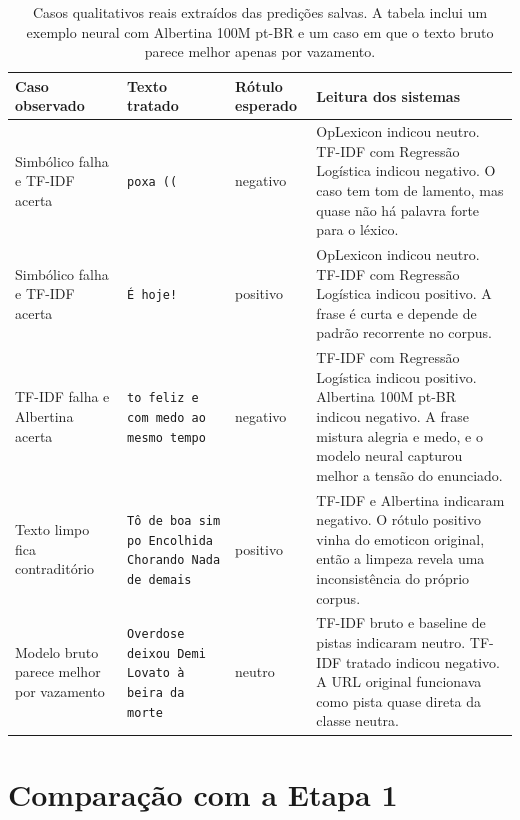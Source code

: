 \documentclass[11pt,a4paper]{article}
\newcommand{\altrowcolors}{\rowcolors{2}{black!4}{white}}
\newcommand{\clearrowcolors}{\rowcolors{2}{}{}}
\begin{document}
\begin{table}[p]
\footnotesize
\centering
\renewcommand{\arraystretch}{1.18}
\altrowcolors
\begin{tabularx}{\linewidth}{@{}L{2.9cm}Y L{1.7cm}Y@{}}
\toprule
\textbf{Caso observado} & \textbf{Texto tratado} & \textbf{Rótulo esperado} & \textbf{Leitura dos sistemas} \\
\midrule
Simbólico falha e TF-IDF acerta & \texttt{poxa ((} & negativo & OpLexicon indicou neutro. TF-IDF com Regressão Logística indicou negativo. O caso tem tom de lamento, mas quase não há palavra forte para o léxico. \\
\addlinespace[0.35em]
Simbólico falha e TF-IDF acerta & \texttt{É hoje!} & positivo & OpLexicon indicou neutro. TF-IDF com Regressão Logística indicou positivo. A frase é curta e depende de padrão recorrente no corpus. \\
\addlinespace[0.35em]
TF-IDF falha e Albertina acerta & \texttt{to feliz e com medo ao mesmo tempo} & negativo & TF-IDF com Regressão Logística indicou positivo. Albertina 100M pt-BR indicou negativo. A frase mistura alegria e medo, e o modelo neural capturou melhor a tensão do enunciado. \\
\addlinespace[0.35em]
Texto limpo fica contraditório & \texttt{Tô de boa sim po Encolhida Chorando Nada de demais} & positivo & TF-IDF e Albertina indicaram negativo. O rótulo positivo vinha do emoticon original, então a limpeza revela uma inconsistência do próprio corpus. \\
\addlinespace[0.35em]
Modelo bruto parece melhor por vazamento & \texttt{Overdose deixou Demi Lovato à beira da morte} & neutro & TF-IDF bruto e baseline de pistas indicaram neutro. TF-IDF tratado indicou negativo. A URL original funcionava como pista quase direta da classe neutra. \\
\bottomrule
\end{tabularx}
\clearrowcolors
\caption{Casos qualitativos reais extraídos das predições salvas. A tabela inclui um exemplo neural com Albertina 100M pt-BR e um caso em que o texto bruto parece melhor apenas por vazamento.}
\label{tab:exemplos}
\end{table}
\FloatBarrier

\section{Comparação com a Etapa 1}
\end{document}
